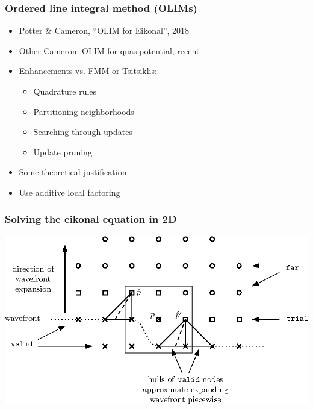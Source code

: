 \documentclass{beamer}
\begin{document}
\begin{frame}
  \frametitle{Ordered line integral method (OLIMs)}
  \begin{itemize}
  \item Potter \& Cameron, ``OLIM for Eikonal'', 2018 \pause
  \item Other Cameron: OLIM for quasipotential, recent \pause
  \item Enhancements vs. FMM or Tsitsiklis: \pause
    \begin{itemize}
    \item Quadrature rules \pause
    \item Partitioning neighborhoods \pause
    \item Searching through updates \pause
    \item Update pruning \pause
    \end{itemize}
  \item Some theoretical justification \pause
  \item Use additive local factoring
  \end{itemize}
\end{frame}

\begin{frame}
\end{frame}

\begin{frame}
  \frametitle{Solving the eikonal equation in 2D}
  \includegraphics[width=\linewidth]{overview.eps}
\end{frame}
\end{document}

